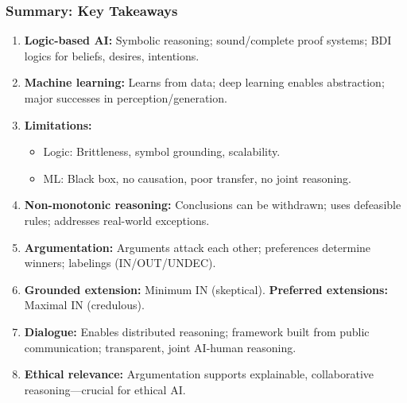 \bigseparator

\subsubsection{Summary: Key Takeaways}

\begin{thmbox}
\begin{enumerate}
  \item \textbf{Logic-based AI:} Symbolic reasoning; sound/complete proof systems; BDI logics for beliefs, desires, intentions.
  \item \textbf{Machine learning:} Learns from data; deep learning enables abstraction; major successes in perception/generation.
  \item \textbf{Limitations:}
  \begin{itemize}
    \item Logic: Brittleness, symbol grounding, scalability.
    \item ML: Black box, no causation, poor transfer, no joint reasoning.
  \end{itemize}
  \item \textbf{Non-monotonic reasoning:} Conclusions can be withdrawn; uses defeasible rules; addresses real-world exceptions.
  \item \textbf{Argumentation:} Arguments attack each other; preferences determine winners; labelings (IN/OUT/UNDEC).
  \item \textbf{Grounded extension:} Minimum IN (skeptical). \textbf{Preferred extensions:} Maximal IN (credulous).
  \item \textbf{Dialogue:} Enables distributed reasoning; framework built from public communication; transparent, joint AI-human reasoning.
  \item \textbf{Ethical relevance:} Argumentation supports explainable, collaborative reasoning---crucial for ethical AI.
\end{enumerate}
\end{thmbox}

